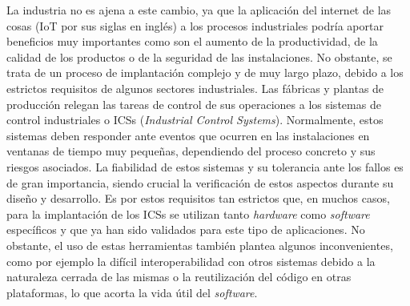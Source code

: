 La industria no es ajena a este cambio, ya que la aplicación del internet de las
cosas (IoT por sus siglas en inglés) a los procesos industriales podría aportar
beneficios muy importantes como son el aumento de la productividad, de la
calidad de los productos o de la seguridad de las instalaciones. No obstante, se
trata de un proceso de implantación complejo y de muy largo plazo, debido a los
estrictos requisitos de algunos sectores industriales. Las fábricas y plantas de
producción relegan las tareas de control de sus operaciones a los sistemas de
control industriales o ICSs (\textit{Industrial Control Systems}). Normalmente,
estos sistemas deben responder ante eventos que ocurren en las instalaciones en
ventanas de tiempo muy pequeñas, dependiendo del proceso concreto y sus riesgos
asociados. La fiabilidad de estos sistemas y su tolerancia ante los fallos es de
gran importancia, siendo crucial la verificación de estos aspectos durante su
diseño y desarrollo. Es por estos requisitos tan estrictos que, en muchos casos,
para la implantación de los ICSs se utilizan tanto \textit{hardware} como
\textit{software} específicos y que ya han sido validados para este tipo de
aplicaciones. No obstante, el uso de estas herramientas también plantea algunos
inconvenientes, como por ejemplo la difícil interoperabilidad con otros sistemas
debido a la naturaleza cerrada de las mismas o la reutilización del código en
otras plataformas, lo que acorta la vida útil del \textit{software}.

